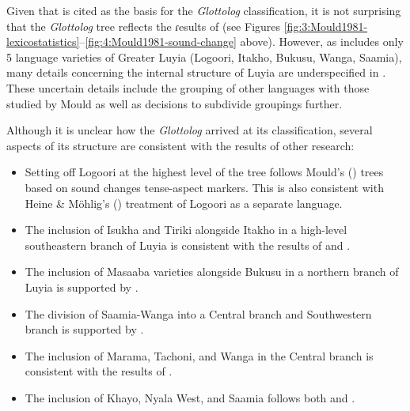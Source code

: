 \documentclass[output=paper]{langscibook}
\begin{document}
Given that \citet{mould_greater_1981} is cited as the basis for the \textit{Glottolog} classification, it is not surprising that the \textit{Glottolog} tree reflects the ɾesults of \citet{mould_greater_1981} (see Figures \ref{fig:3:Mould1981-lexicostatistics}--\ref{fig:4:Mould1981-sound-change} above). However, as \citet{mould_greater_1981} includes only 5 language varieties of Greater Luyia (Logoori, Itakho, Bukusu, Wanga, Saamia), many details concerning the internal structure of Luyia are underspecified in \citet{mould_greater_1981}. These uncertain details include the grouping of other languages with those studied by Mould as well as decisions to subdivide  groupings further.

Although it is unclear how the \textit{Glottolog} arrived at its classification, several aspects of its structure are consistent with the results of other research:

\begin{itemize}
    \item Setting off Logoori at the highest level of the tree follows Mould's (\citeyear[]{mould_greater_1981}) trees based on sound changes tense-aspect markers. This is also consistent with Heine \& Möhlig's (\citeyear{heine_language_1980}) treatment of Logoori as a separate language.
    
    \item The inclusion of Isukha and Tiriki alongside Itakho in a high-level southeastern branch of Luyia is consistent with the results of \citet{williams_lexico-statistical_1973} and \citet{heine_language_1980}.
    
    \item The inclusion of Masaaba varieties alongside Bukusu in a northern branch of Luyia is supported by \citet{williams_lexico-statistical_1973}.
    
    \item The division of Saamia-Wanga into a Central branch and Southwestern branch is supported by \citet{williams_lexico-statistical_1973}.
    
    \item The inclusion of Marama, Tachoni, and Wanga in the Central branch is consistent with the results of \citet{williams_lexico-statistical_1973}.
    
    \item The inclusion of Khayo, Nyala West, and Saamia follows both \citet{williams_lexico-statistical_1973} and \citet{heine_language_1980}.
\end{itemize}
\end{document}
